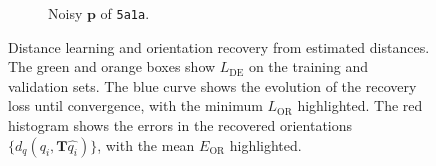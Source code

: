 \begin{figure}[t]
\begin{subfigure}[b]{0.232\linewidth}
        \caption{Noisy $\mathbf{p}$ of \texttt{5a1a}.
        }%
        \label{fig:5a1a-noise16-orientation-recovery}
    \end{subfigure}
    \hfill
    \caption{%
        Distance learning and orientation recovery from estimated distances.
        The green and orange boxes show $L_\text{DE}$  on the training and validation sets.
        The blue curve shows the evolution of the recovery loss until convergence, with the minimum $L_\text{OR}$  highlighted.
        The red histogram shows the errors in the recovered orientations $\{d_q(q_i, \mathbf{T}\widehat{q_i})\}$, with the mean $E_\text{OR}$  highlighted.
    }
\end{figure}

